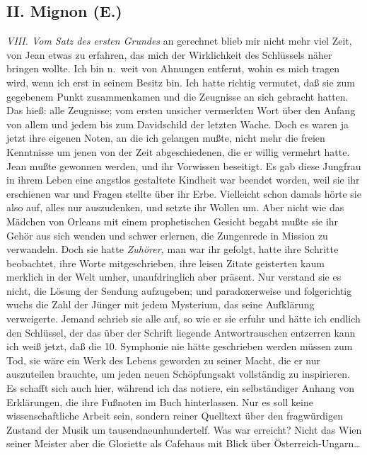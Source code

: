 \documentclass[
]{article}
\author{}
\date{\vspace{-2.5em}}
\begin{document}
\subsection{II. Mignon (E.)}\label{ii.-mignon-e.}

\emph{VIII. Vom Satz des ersten Grundes }an gerechnet blieb mir nicht
mehr viel Zeit, von Jean etwas zu erfahren, das mich der Wirklichkeit
des Schlüssels näher bringen wollte. Ich bin n.~weit von Ahnungen
entfernt, wohin es mich tragen wird, wenn ich erst in seinem Besitz bin.
Ich hatte richtig vermutet, daß sie zum gegebenem Punkt zusammenkamen
und die Zeugnisse an sich gebracht hatten. Das hieß: alle Zeugnisse; vom
ersten unsicher vermerkten Wort über den Anfang von allem und jedem bis
zum Davidschild der letzten Wache. Doch es waren ja jetzt ihre eigenen
Noten, an die ich gelangen mußte, nicht mehr die freien Kenntnisse um
jenen von der Zeit abgeschiedenen, die er willig vermehrt hatte. Jean
mußte gewonnen werden, und ihr Vorwissen beseitigt. Es gab diese
Jungfrau in ihrem Leben eine angstlos gestaltete Kindheit war beendet
worden, weil sie ihr erschienen war und Fragen stellte über ihr Erbe.
Vielleicht schon damals hörte sie also auf, alles nur auszudenken, und
setzte ihr Wollen um. Aber nicht wie das Mädchen von Orleans mit einem
prophetischen Gesicht begabt mußte sie ihr Gehör aus sich wenden und
schwer erlernen, die Zungenrede in Mission zu verwandeln. Doch sie hatte
\emph{Zuhörer, }man war ihr gefolgt, hatte ihre Schritte beobachtet,
ihre Worte mitgeschrieben, ihre leisen Zitate geisterten kaum merklich
in der Welt umher, unaufdringlich aber präsent. Nur verstand sie es
nicht, die Lösung der Sendung aufzugeben; und paradoxerweise und
folgerichtig wuchs die Zahl der Jünger mit jedem Mysterium, das seine
Aufklärung verweigerte. Jemand schrieb sie alle auf, so wie er sie
erfuhr und hätte ich endlich den Schlüssel, der das über der Schrift
liegende Antwortrauschen entzerren kann ich weiß jetzt, daß die 10.
Symphonie nie hätte geschrieben werden müssen zum Tod, sie wäre ein Werk
des Lebens geworden zu seiner Macht, die er nur auszuteilen brauchte, um
jeden neuen Schöpfungsakt vollständig zu inspirieren. Es schafft sich
auch hier, während ich das notiere, ein selbständiger Anhang von
Erklärungen, die ihre Fußnoten im Buch hinterlassen. Nur es soll keine
wissenschaftliche Arbeit sein, sondern reiner Quelltext über den
fragwürdigen Zustand der Musik um tausendneunhundertelf. Was war
erreicht? Nicht das Wien seiner Meister aber die Gloriette als Cafehaus
mit Blick über Österreich-Ungarn\ldots{}
\end{document}
